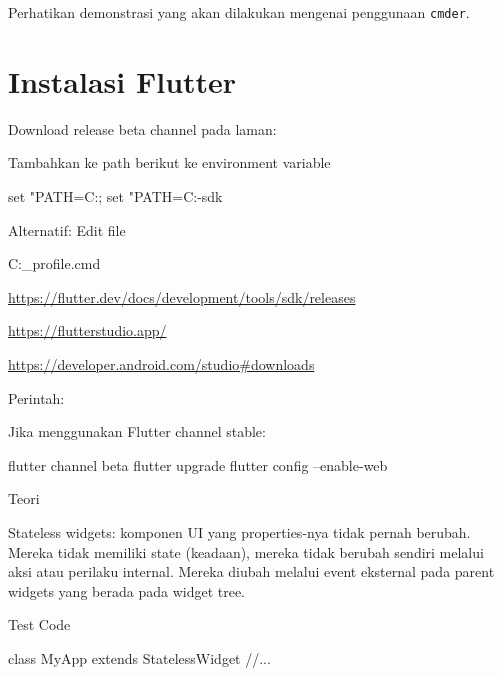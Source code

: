 \documentclass[a4paper,11pt]{article} %
\newcommand{\txtinline}[1]{\texttt{#1}}
\begin{document}
Perhatikan demonstrasi yang akan dilakukan mengenai penggunaan \txtinline{cmder}.

\section{Instalasi Flutter}

Download release beta channel pada laman:

Tambahkan ke path berikut ke environment variable
\begin{textcode}
set "PATH=C:\Users\jendela\flutter\bin;%
set "PATH=C:\Users\jendela\flutter\bin\cache\dart-sdk\bin
\end{textcode}


Alternatif: Edit file
\begin{textcode}
C:\Users\jendela\cmder\config\user_profile.cmd
\end{textcode}

{\footnotesize\url{https://flutter.dev/docs/development/tools/sdk/releases}}

{\footnotesize\url{https://flutterstudio.app/}}

{\footnotesize\url{https://developer.android.com/studio#downloads}}

Perintah:

Jika menggunakan Flutter channel stable:
\begin{textcode}
flutter channel beta
flutter upgrade
flutter config --enable-web
\end{textcode}

Teori

Stateless widgets: komponen UI yang properties-nya tidak pernah berubah.
Mereka tidak memiliki state (keadaan), mereka tidak berubah sendiri melalui
aksi atau perilaku internal. Mereka diubah melalui event eksternal pada parent widgets
yang berada pada widget tree.


Test Code
\begin{dartcode}
class MyApp extends StatelessWidget {
  //...
}
\end{dartcode}





\end{document}
